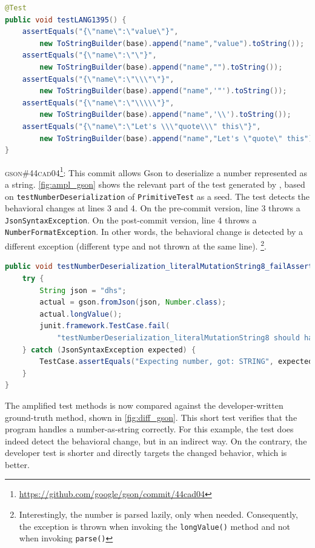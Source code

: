 \begin{lstlisting}[language=java,caption=Developer test for \textsc{e7d16c2} of commons-lang.,label=fig:diff_commons-lang]
@Test
public void testLANG1395() {
	assertEquals("{\"name\":\"value\"}",
		new ToStringBuilder(base).append("name","value").toString());
	assertEquals("{\"name\":\"\"}",
		new ToStringBuilder(base).append("name","").toString());
	assertEquals("{\"name\":\"\\\"\"}",
		new ToStringBuilder(base).append("name",'"').toString());
	assertEquals("{\"name\":\"\\\\\"}",
		new ToStringBuilder(base).append("name",'\\').toString());
	assertEquals("{\"name\":\"Let's \\\"quote\\\" this\"}",
		new ToStringBuilder(base).append("name","Let's \"quote\" this").toString());
}
\end{lstlisting}

\textsc{gson\#44cad04}\footnote{\url{https://github.com/google/gson/commit/44cad04}}: This commit allows Gson to deserialize a number represented as a string.
\autoref{fig:ampl_gson} shows the relevant part of the test generated by \DCII, based on \texttt{testNumberDeserialization} of \texttt{PrimitiveTest} as a seed.
The \DCI test detects the behavioral changes at lines 3 and 4.
On the pre-commit version, line 3 throws a \texttt{JsonSyntaxException}.
On the post-commit version, line 4 throws a \texttt{NumberFormatException}.
In other words, the behavioral change is detected by a different exception (different type and not thrown at the same line).
\footnote{Interestingly, the number is parsed lazily, only when needed. 
Consequently, the exception is thrown when invoking the \texttt{longValue()} method and not when invoking \texttt{parse()}}.

\begin{lstlisting}[language=java,caption=Test generated by DCI that detects the behavioral change of commit \textsc{44cad04} in Gson.,label=fig:ampl_gson]
public void testNumberDeserialization_literalMutationString8_failAssert0() throws Exception {
	try {
		String json = "dhs";
		actual = gson.fromJson(json, Number.class);
		actual.longValue();
		junit.framework.TestCase.fail(
			"testNumberDeserialization_literalMutationString8 should have thrown JsonSyntaxException");
	} catch (JsonSyntaxException expected) {
		TestCase.assertEquals("Expecting number, got: STRING", expected.getMessage());
	}
}
\end{lstlisting}
The amplified test methods is now compared against the developer-written ground-truth method, shown in \autoref{fig:diff_gson}. 
This short test verifies that the program handles a number-as-string correctly.
For this example, the \DCI test does indeed detect the behavioral change, but in an indirect way.
On the contrary, the developer test is shorter and directly targets the changed behavior, which is better.

